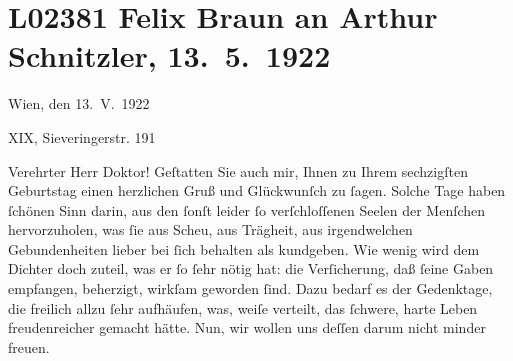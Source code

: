 

\section[Felix Braun an Arthur Schnitzler, 13. 5. 1922]{L02381 Felix Braun an Arthur Schnitzler, 13. 5. 1922}
\nopagebreak{}
\rehead{ }\normalsize\beginnumbering{}
\toendnotes[C]{\smallbreak\pagebreak[2]}
\toendnotes[C]{\smallbreak}
\pstart
           \raggedleft{}{\pb}Wien, den 13. V. 1922\pend
           
\pstart
           \raggedleft{}XIX, Sieveringerstr. 191\pend
           
\pstart{}Verehrter Herr Doktor!\pend\vspace{0.5em}
\pstart
           Geſtatten Sie auch mir, Ihnen zu Ihrem sechzigſten Geburtstag einen herzlichen Gruß
               und Glückwunſch zu ſagen. Solche Tage haben \label{T_L02381-1v}\label{T_L02381-1} ſchönen Sinn darin, aus den ſonſt
               leider ſo verſchloſſenen Seelen der Menſchen hervorzuholen, was ſie aus Scheu, aus
               Trägheit, aus irgendwelchen Gebundenheiten lieber bei ſich behalten als kundgeben.
               Wie wenig wird dem Dichter doch zuteil, was er ſo ſehr nötig hat: die Verſicherung,
               daß ſeine Gaben empfangen, beherzigt, wirkſam geworden ſind. Dazu bedarf es der
               Gedenktage, die freilich allzu ſehr aufhäufen, was, weiſe verteilt, das ſchwere,
               harte Leben freudenreicher gemacht hätte. Nun, wir wollen uns deſſen darum nicht
               minder freuen.\pend
           
